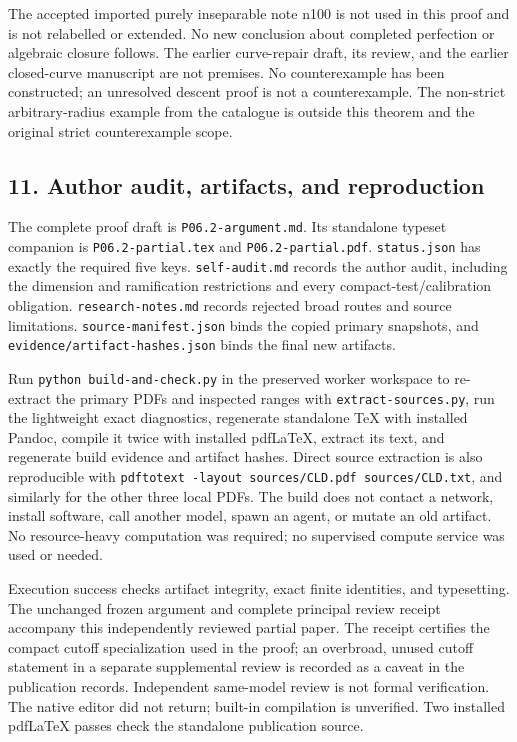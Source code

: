 \documentclass[
  11pt,
]{article}
\begin{document}
The accepted imported purely inseparable note n100 is not used in this
proof and is not relabelled or extended. No new conclusion about
completed perfection or algebraic closure follows. The earlier
curve-repair draft, its review, and the earlier closed-curve manuscript
are not premises. No counterexample has been constructed; an unresolved
descent proof is not a counterexample. The non-strict arbitrary-radius
example from the catalogue is outside this theorem and the original
strict counterexample scope.

\subsection{11. Author audit, artifacts, and
reproduction}\label{author-audit-artifacts-and-reproduction}

The complete proof draft is \texttt{P06.2-argument.md}. Its standalone
typeset companion is \texttt{P06.2-partial.tex} and
\texttt{P06.2-partial.pdf}. \texttt{status.json} has exactly the
required five keys. \texttt{self-audit.md} records the author audit,
including the dimension and ramification restrictions and every
compact-test/calibration obligation. \texttt{research-notes.md} records
rejected broad routes and source limitations.
\texttt{source-manifest.json} binds the copied primary snapshots, and
\texttt{evidence/artifact-hashes.json} binds the final new artifacts.

Run \texttt{python\ build-and-check.py} in the preserved worker workspace
to re-extract
the primary PDFs and inspected ranges with \texttt{extract-sources.py},
run the lightweight exact diagnostics, regenerate standalone TeX with
installed Pandoc, compile it twice with installed pdfLaTeX, extract its
text, and regenerate build evidence and artifact hashes. Direct source
extraction is also reproducible with
\texttt{pdftotext\ -layout\ sources/CLD.pdf\ sources/CLD.txt}, and
similarly for the other three local PDFs. The build does not contact a
network, install software, call another model, spawn an agent, or mutate
an old artifact. No resource-heavy computation was required; no
supervised compute service was used or needed.

Execution success checks artifact integrity, exact finite identities,
and typesetting. The unchanged frozen argument and complete principal
review receipt accompany this independently reviewed partial paper. The
receipt certifies the compact cutoff specialization used in the proof;
an overbroad, unused cutoff statement in a separate supplemental review
is recorded as a caveat in the publication records. Independent
same-model review is not formal verification. The native editor did not
return; built-in compilation is unverified. Two installed pdfLaTeX
passes check the standalone publication source.
\end{document}
